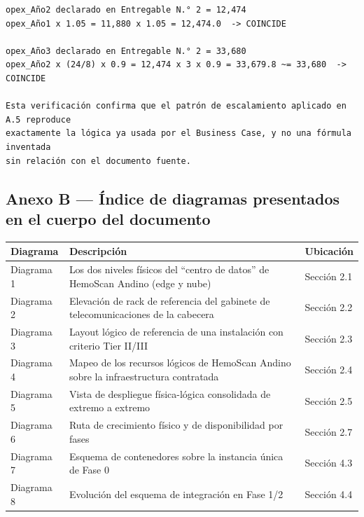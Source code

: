 \documentclass[11pt,a4paper]{article}
\begin{document}
\begin{samepage}\begin{verbatim}
opex_Año2 declarado en Entregable N.° 2 = 12,474
opex_Año1 x 1.05 = 11,880 x 1.05 = 12,474.0  -> COINCIDE

opex_Año3 declarado en Entregable N.° 2 = 33,680
opex_Año2 x (24/8) x 0.9 = 12,474 x 3 x 0.9 = 33,679.8 ~= 33,680  -> COINCIDE

Esta verificación confirma que el patrón de escalamiento aplicado en A.5 reproduce
exactamente la lógica ya usada por el Business Case, y no una fórmula inventada
sin relación con el documento fuente.
\end{verbatim}\end{samepage}

\subsection{Anexo B --- Índice de diagramas presentados en el cuerpo del documento}\label{anexo-b-uxedndice-de-diagramas-presentados-en-el-cuerpo-del-documento}

{\small
\begin{longtable}[]{@{}
  >{\raggedright\arraybackslash}p{}
  >{\raggedright\arraybackslash}p{}
  >{\raggedright\arraybackslash}p{}@{}}
\toprule\noalign{}
\begin{minipage}[b]{\linewidth}\raggedright
Diagrama
\end{minipage} & \begin{minipage}[b]{\linewidth}\raggedright
Descripción
\end{minipage} & \begin{minipage}[b]{\linewidth}\raggedright
Ubicación
\end{minipage} \\
\midrule\noalign{}
\endhead
\bottomrule\noalign{}
\endlastfoot
Diagrama 1 & Los dos niveles físicos del ``centro de datos'' de HemoScan Andino (edge y nube) & Sección 2.1 \\
Diagrama 2 & Elevación de rack de referencia del gabinete de telecomunicaciones de la cabecera & Sección 2.2 \\
Diagrama 3 & Layout lógico de referencia de una instalación con criterio Tier II/III & Sección 2.3 \\
Diagrama 4 & Mapeo de los recursos lógicos de HemoScan Andino sobre la infraestructura contratada & Sección 2.4 \\
Diagrama 5 & Vista de despliegue física-lógica consolidada de extremo a extremo & Sección 2.5 \\
Diagrama 6 & Ruta de crecimiento físico y de disponibilidad por fases & Sección 2.7 \\
Diagrama 7 & Esquema de contenedores sobre la instancia única de Fase 0 & Sección 4.3 \\
Diagrama 8 & Evolución del esquema de integración en Fase 1/2 & Sección 4.4 \\
\end{longtable}
}
\end{document}
